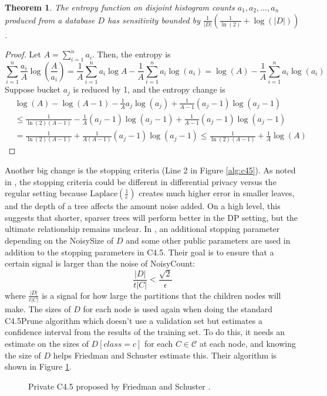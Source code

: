 \documentclass[11pt]{article}
\newtheorem{theorem}{Theorem}
\begin{document}
\begin{theorem}\label{thm:ent_sens}
The entropy function on disjoint histogram counts $a_1,a_2,\ldots, a_n$ produced from a database $D$ has sensitivity bounded by $\frac{1}{|D|}\left(\frac{1}{\ln(2)} + \log(|D|) \right)$.
\end{theorem}
\begin{proof}
Let $A = \sum_{i=1}^n a_i$. Then, the entropy is 
\[
\sum_{i=1}^n \frac{a_i}{A}\log\left(\frac{A}{a_i}\right) = \frac{1}{A}\sum_{i=1}^n a_i\log A - \frac{1}{A} \sum_{i=1}^n a_i\log(a_i) = \log(A) - \frac{1}{A}\sum_{i=1}^n a_i\log(a_i)
\]
Suppose bucket $a_j$ is reduced by 1, and the entropy change is
\begin{align*}
&\log(A) - \log(A-1) - \frac{1}{A} a_j\log(a_j) + \frac{1}{A-1} (a_j-1)\log(a_j-1) \\
&\leq \frac{1}{\ln(2)(A-1)} -\frac{1}{A}(a_j-1)\log(a_j-1) + \frac{1}{A-1}(a_j-1)\log(a_j-1) \\
&= \frac{1}{\ln(2)(A-1)}+\frac{1}{A(A-1)}(a_j-1)\log(a_j-1) \leq \frac{1}{\ln(2)(A-1)} + \frac{1}{A}\log(A)
\end{align*}
\end{proof}
Another big change is the stopping criteria (Line 2 in Figure \ref{alg:c45}). As noted in \cite{Fletcher:2016}, the stopping criteria could be different in differential privacy versus the regular setting because $\text{Laplace}\left(\frac{1}{\epsilon}\right)$ creates much higher error in smaller leaves, and the depth of a tree affects the amount noise added. On a high level, this suggests that shorter, sparser trees will perform better in the DP setting, but the ultimate relationship remains unclear. In \cite{Friedman:2010}, an additional stopping parameter depending on the NoisySize of $D$ and some other public parameters are used in addition to the stopping parameters in C4.5. Their goal is to ensure that a certain signal is larger than the noise of NoisyCount:
\[
\frac{|D|}{t|C|} < \frac{\sqrt{2}}{\epsilon}
\]
where $\frac{|D|}{t|C|}$ is a signal for how large the partitions that the children nodes will make. The sizes of $D$ for each node is used again when doing the standard C4.5Prune algorithm \cite{Quinlan:1993} which doesn't use a validation set but estimates a confidence interval from the results of the training set. To do this, it needs an estimate on the sizes of $D[class=c]$ for each $C \in \mathcal{C}$ at each node, and knowing the size of $D$ helps Friedman and Schuster estimate this. Their algorithm is shown in Figure \ref{alg:pc45}.
\begin{figure}

\caption{Private C4.5 proposed by Friedman and Schuster \cite{Friedman:2010}. } \label{alg:pc45}
\end{figure}
\end{document}
